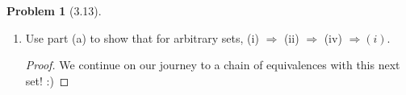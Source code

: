 \documentclass[12pt]{article}
\renewcommand{\epsilon}{\varepsilon}
\theoremstyle{definition}
\newtheorem{problem}{Problem}
\begin{document}
\begin{problem}[3.13]
\begin{enumerate}[label = \alph{*}.]
\begin{proof}
\begin{enumerate}
                        Let \( \epsilon > 0 \) be chosen. By assumption, for any set \( E \), there exists a finite union \( U \) of open intervals so that \( \)
                                \begin{align*}
                                    m^{*}( U \Delta E) = m( (U \setminus E) \cup (E \setminus U)) < \frac{2 \epsilon}{3}.
                                \end{align*}
                        By Proposition 3.5, there exists an open set \( O \supset E \setminus U \) so that 
                                \[
                                    m^{*}(O) \leq m(E \setminus U) + \frac{\epsilon}{3} 
                                \]
                        which is equivalent to saying that
                                \[
                                    m^{*}(O \setminus(E \setminus U)) < \frac{\epsilon}{3}.  
                                \]
                        Note that \( E \subset O \cup U \) trivially. Thus, we have that 
                                \begin{align*}
                                    m^{*}(O \setminus E) &\leq m^{*}( (U \cup O) \setminus (E)) \\
                                                         &= m^{*}((U \setminus E) \cup (O \setminus E) ) \\
                                                         &\leq m( (O \setminus(E \setminus U)) \cup (U \setminus E) \cup (E \setminus U)) \\
                                                         &= m(O \setminus(E \setminus U)) + m(U \setminus E) + m(E \setminus U) \\
                                                         &< \frac{2 \epsilon}{3} + \frac{\epsilon}{3} \\
                                                         &= \epsilon
                                \end{align*}
                        giving us the desired result.
                \end{enumerate}
                This completes the first set of our chain of equivalences.
            \end{proof}
            \item Use part (a) to show that for arbitrary sets,  (i) \( \Rightarrow \) (ii)  \( \Rightarrow \) (iv)  \( \Rightarrow (i) \).
            \begin{proof}
                We continue on our journey to a chain of equivalences with this next set! :)


\end{proof}
\end{enumerate}
\end{problem}
\end{document}
